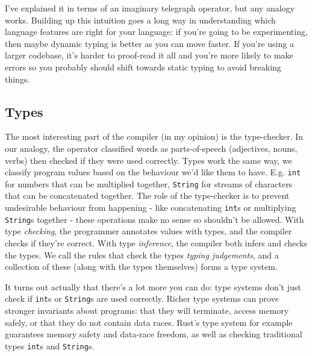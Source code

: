 I've explained it in terms of an imaginary telegraph operator, but any
analogy works. Building up this intuition goes a long way in
understanding which language features are right for your language: if
you're going to be experimenting, then maybe dynamic typing is better as
you can move faster. If you're using a larger codebase, it's harder to
proof-read it all and you're more likely to make errors so you probably
should shift towards static typing to avoid breaking things.

\hypertarget{types}{%
\subsection{\texorpdfstring{\protect\hyperlink{types}{}Types}{Types}}\label{types}}

The most interesting part of the compiler (in my opinion) is the
type-checker. In our analogy, the operator classified words as
parts-of-speech (adjectives, nouns, verbs) then checked if they were
used correctly. Types work the same way, we classify program values
based on the behaviour we'd like them to have. E.g. \texttt{int} for
numbers that can be multiplied together, \texttt{String} for streams of
characters that can be concatenated together. The role of the
type-checker is to prevent undesirable behaviour from happening - like
concatenating \texttt{int}s or multiplying \texttt{String}s together -
these operations make no sense so shouldn't be allowed. With type
\emph{checking}, the programmer annotates values with types, and the
compiler checks if they're correct. With type \emph{inference}, the
compiler both infers and checks the types. We call the rules that check
the types \emph{typing judgements}, and a collection of these (along
with the types themselves) forms a type system.

It turns out actually that there's a lot more you can do: type systems
don't just check if \texttt{int}s or \texttt{String}s are used
correctly. Richer type systems can prove stronger invariants about
programs: that they will terminate, access memory safely, or that they
do not contain data races. Rust's type system for example guarantees
memory safety and data-race freedom, as well as checking traditional
types \texttt{int}s and \texttt{String}s.

%
%
%
%

